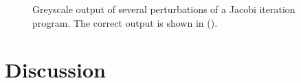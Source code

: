\documentclass[9pt]{sigplanconf}
\theoremstyle{definition}
\begin{document}
\begin{figure}[t]
  \centering
  \caption{Greyscale output of several perturbations of a Jacobi
    iteration program. The correct output is shown in
    ().}
  \label{fig:jacobi}
\end{figure}






\section{Discussion}
\label{sec:discussion}
\end{document}

